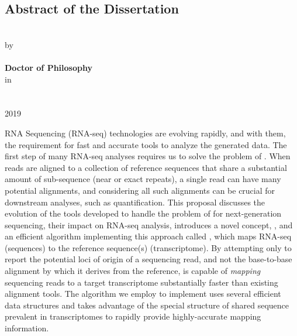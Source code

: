 \documentclass[
12pt, %
oneside, %
english, %
singlespacing, %
liststotoc, %
parskip, %
headsepline, %
]{main} %
\begin{document}


\renewcommand{\abstractname}{Abstract of the Dissertation}
\begin{center}
	\section*{\abstractname}
	\addchaptertocentry{\abstractname} %

		\textbf{\ttitle} \\ [0.5cm]
		by  \\ [0.5cm]
		\textbf{\authorname} \\ [0.5cm]
		\textbf{Doctor of Philosophy} \\ [0.5cm]
		in \\ [0.5cm]
		\textbf{\deptname}  \\ [0.5cm]
		\univname  \\ [0.5cm]
		2019  \\ [0.5cm]
\end{center}

RNA Sequencing (RNA-seq) technologies are evolving rapidly, and with them, the requirement 
for fast and accurate tools to analyze the generated data. The first step of many RNA-seq
analyses requires us to solve the problem of \ra. When reads are aligned to a collection of 
reference sequences that share a substantial amount of sub-sequence (near or exact repeats), 
a single read can have many potential alignments, and considering all such alignments can be 
crucial for downstream analyses, such as quantification. This proposal discusses the evolution of 
the tools developed to handle the problem of \ra for next-generation sequencing, their impact 
on RNA-seq analysis, introduces a novel concept, \qm, and an efficient algorithm implementing 
this approach called \rapmap, which maps RNA-seq \reads (sequences) to the reference sequence(s) 
(transcriptome). By attempting only to report the potential loci of origin of a sequencing read, 
and not the base-to-base alignment by which it derives from the reference, \rapmap is capable of 
\textit{mapping} sequencing reads to a target transcriptome substantially faster than existing 
alignment tools. The algorithm we employ to implement \qm uses several efficient data structures 
and takes advantage of the special structure of shared sequence prevalent in transcriptomes to 
rapidly provide highly-accurate mapping information.
\end{document}
